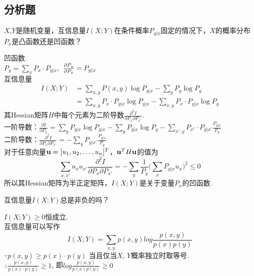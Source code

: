\documentclass[a4paper]{exam}
\begin{document}
\begin{CJK*}{UTF8}{gbsn}
\section*{分析题}
\begin{questions}
    \question 
$X$,$Y$是随机变量，互信息量$I(X;Y)$在条件概率${P_{y|x}}$固定的情况下，$X$的概率分布${P_x}$是凸函数还是凹函数？
    \begin{solution}
    凹函数.\\
   ${P_y} = \sum\limits_x {{P_x} \cdot {P_{y|x}}}$, ${\kern 1pt} {\kern 1pt} \frac{{\partial {P_y}}}{{\partial {P_x}}} = {P_{y|x}}$\\互信息量
   \begin{equation*}
 \begin{split}
   I(X;Y) & = \sum\limits_{x,y} {P(x,y)\log {P_{y|x}}}  - \sum\limits_y {{P_y}\log {P_y}}\\
      & = \sum\limits_{x,y} {{P_x} \cdot {P_{y|x}}\log {P_{y|x}}}  - \sum\limits_{x,y} {{P_x} \cdot {P_{y|x}}\log {P_y}} 
   \end{split}
   \end{equation*}
   其Hessian矩阵$H$中每个元素为二阶导数$\frac{{{\partial ^2}I}}{{\partial {P_x}\partial {P_{x'}}}}$.\\
   一阶导数：$\frac{{\partial I}}{{\partial {P_x}}} = \sum\limits_y {{P_{y|x}}\log {P_{y|x}}}  - \sum\limits_y {{P_{y|x}}\log {P_y}}  - \sum\limits_{x',y} {{P_{x'}} \cdot {P_{y|x'}}\frac{{{P_{y|x}}}}{{{P_y}}}} $\\
   二阶导数：$\frac{{{\partial ^2}I}}{{\partial {P_x}\partial {P_{x'}}}} =  - \sum\limits_y {{P_{y|x'}}\frac{{{P_{y|x}}}}{{{P_y}}}} $\\
   对于任意向量${\bf{u}} = {[{u_1},{u_2}, \ldots ,{u_n}]^T}$，${{\bf{u}}^T}H{\bf{u}}$的值为
   \[\sum\limits_{x,x'} {{u_x}{u_{x'}}\frac{{{\partial ^2}I}}{{\partial {P_x}\partial {P_{x'}}}} =  - \sum\limits_y {\frac{1}{{{P_y}}}} } (\sum\limits_x {{P_{y|x}}{u_x}{)^2} \le 0} \]
   所以其Hessian矩阵为半正定矩阵，$I(X;Y)$是关于变量$P_x$的凹函数.
    \end{solution}
    \vspace{1.5cm}
    \question
互信息量$I(X;Y)$总是非负的吗？
    \begin{solution}
    $I(X;Y) \ge 0$恒成立.\\
    互信息量可以写作\[I(X;Y) = \sum\limits_{x,y} {p(x,y)log\frac{{p(x,y)}}{{p(x)p(y)}}} \]
    $\because p(x,y) \ge p(x) \cdot p(y)$ 当且仅当$X$, $Y$概率独立时取等号.\\   $\therefore \frac{{p(x,y)}}{{p(x) \cdot p(y)}} \ge 1$, 即$log\frac{{p(x,y)}}{{p(x)p(y)}} \ge 0$\\

\end{solution}
\end{questions}
\end{CJK*}
\end{document}
